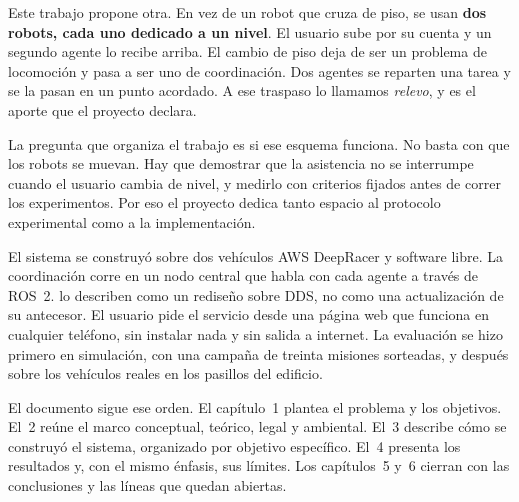 Este trabajo propone otra. En vez de un robot que cruza de piso, se usan
\textbf{dos robots, cada uno dedicado a un nivel}. El usuario sube por su cuenta
y un segundo agente lo recibe arriba. El cambio de piso deja de ser un problema
de locomoción y pasa a ser uno de coordinación. Dos agentes se reparten una tarea
y se la pasan en un punto acordado. A ese traspaso lo llamamos \emph{relevo}, y
es el aporte que el proyecto declara.

La pregunta que organiza el trabajo es si ese esquema funciona. No basta con que
los robots se muevan. Hay que demostrar que la asistencia no se interrumpe cuando
el usuario cambia de nivel, y medirlo con criterios fijados antes de correr los
experimentos. Por eso el proyecto dedica tanto espacio al protocolo
experimental como a la implementación.

El sistema se construyó sobre dos vehículos AWS DeepRacer y software libre. La
coordinación corre en un nodo central que habla con cada agente a través de
ROS~2. \textcite{macenski2022ros2} lo describen como un rediseño sobre DDS, no
como una actualización de su antecesor. El usuario pide el
servicio desde una página web que funciona en cualquier teléfono, sin instalar
nada y sin salida a internet.
La evaluación se hizo primero en simulación, con una campaña de treinta misiones
sorteadas, y después sobre los vehículos reales en los pasillos del edificio.

El documento sigue ese orden. El capítulo~1 plantea el problema y los objetivos.
El~2 reúne el marco conceptual, teórico, legal y ambiental. El~3 describe cómo se
construyó el sistema, organizado por objetivo específico. El~4 presenta los
resultados y, con el mismo énfasis, sus límites. Los capítulos~5 y~6 cierran con
las conclusiones y las líneas que quedan abiertas.
